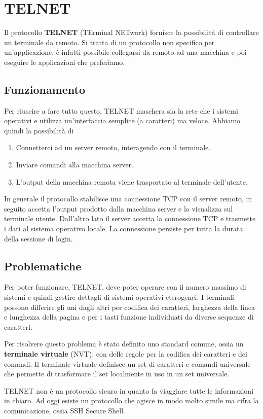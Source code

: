 \section{TELNET}
Il protocollo \textbf{TELNET} (TErminal NETwork) fornisce la 
possibilità di controllare un terminale da remoto. Si tratta di un 
protocollo non specifico per un'applicazione, è infatti possibile 
collegarsi da remoto ad una macchina e poi eseguire le applicazioni 
che preferiamo.

\subsection{Funzionamento}
Per riuscire a fare tutto questo, TELNET maschera sia la rete che i 
sistemi operativi e utilizza un'interfaccia semplice (a caratteri) ma 
veloce. Abbiamo quindi la possibilità di
\begin{enumerate}
	\item Connetterci ad un server remoto, interagendo con il 
		terminale.
	\item Inviare comandi alla macchina server.
	\item L'output della macchina remota viene trasportato al terminale
		dell'utente.
\end{enumerate}
In generale il protocollo stabilisce una connessione TCP con il server 
remoto, in seguito accetta l'output prodotto dalla macchina server e lo
visualizza sul terminale utente. Dall'altro lato il server accetta la 
connessione TCP e trasmette i dati al sistema operativo locale. La 
connessione persiste per tutta la durata della sessione di login.

\subsection{Problematiche}
Per poter funzionare, TELNET, deve poter operare con il numero massimo 
di sistemi e quindi gestire dettagli di sistemi operativi eterogenei.
I terminali possono differire gli uni dagli altri per codifica dei 
caratteri, larghezza della linea e lunghezza della pagina e per i tasti
funzione individuati da diverse sequenze di caratteri.

Per risolvere questo problema è stato definito uno standard comune, 
ossia un \textbf{terminale virtuale} (NVT), con delle regole per la
codifica dei caratteri e dei comandi.
Il terminale virtuale definisce un set di caratteri e comandi 
universale che permette di trasformare il set localmente in uso in un 
set universale.

TELNET non è un protocollo sicuro in quanto fa viaggiare tutte le 
informazioni in chiaro. Ad oggi esiste un protocollo che agisce in modo
molto simile ma cifra la comunicazione, ossia SSH Secure Shell.
